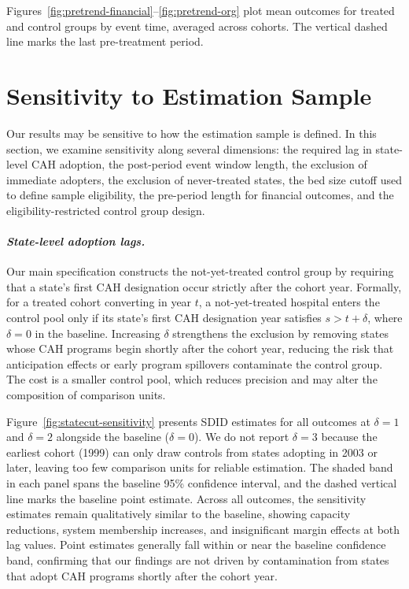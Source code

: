 \documentclass[a4paper, 12pt]{article}
\begin{document}
Figures~\ref{fig:pretrend-financial}--\ref{fig:pretrend-org} plot mean outcomes for treated and control groups by event time, averaged across cohorts. The vertical dashed line marks the last pre-treatment period.



\section{Sensitivity to Estimation Sample}
\label{sec:app-sample}

Our results may be sensitive to how the estimation sample is defined. In this section, we examine sensitivity along several dimensions: the required lag in state-level CAH adoption, the post-period event window length, the exclusion of immediate adopters, the exclusion of never-treated states, the bed size cutoff used to define sample eligibility, the pre-period length for financial outcomes, and the eligibility-restricted control group design.

\paragraph{\textit{State-level adoption lags.}}
Our main specification constructs the not-yet-treated control group by requiring that a state's first CAH designation occur strictly after the cohort year. Formally, for a treated cohort converting in year $t$, a not-yet-treated hospital enters the control pool only if its state's first CAH designation year satisfies $s > t + \delta$, where $\delta = 0$ in the baseline. Increasing $\delta$ strengthens the exclusion by removing states whose CAH programs begin shortly after the cohort year, reducing the risk that anticipation effects or early program spillovers contaminate the control group. The cost is a smaller control pool, which reduces precision and may alter the composition of comparison units.

Figure~\ref{fig:statecut-sensitivity} presents SDID estimates for all outcomes at $\delta = 1$ and $\delta = 2$ alongside the baseline ($\delta = 0$). We do not report $\delta = 3$ because the earliest cohort (1999) can only draw controls from states adopting in 2003 or later, leaving too few comparison units for reliable estimation. The shaded band in each panel spans the baseline 95\% confidence interval, and the dashed vertical line marks the baseline point estimate. Across all outcomes, the sensitivity estimates remain qualitatively similar to the baseline, showing capacity reductions, system membership increases, and insignificant margin effects at both lag values. Point estimates generally fall within or near the baseline confidence band, confirming that our findings are not driven by contamination from states that adopt CAH programs shortly after the cohort year.
\end{document}
